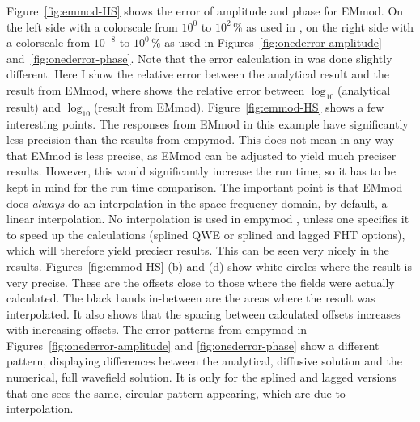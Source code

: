 \documentclass[manuscript,revised]{geophysics}
\begin{document}
Figure~\ref{fig:emmod-HS} shows the error of amplitude and phase for EMmod.
On the left side with a colorscale from $10^0$ to $10^2$\,\% as used in
\cite{GEO.15.Hunziker}, on the right side with a colorscale
from $10^{-8}$ to $10^0$\,\% as used in Figures~\ref{fig:onederror-amplitude}
and~\ref{fig:onederror-phase}. Note that the error calculation in
\cite{GEO.15.Hunziker} was done slightly different. Here I
show the relative error between the analytical result and the result from
EMmod, where \cite{GEO.15.Hunziker} shows the relative error
between $\log_{10}$(analytical result) and $\log_{10}$(result from EMmod).
%
%
Figure~\ref{fig:emmod-HS} shows a few interesting points. The responses from
EMmod in this example have significantly less precision than the results from
empymod. This does not mean in any way that EMmod is less precise, as EMmod
can be adjusted to yield much preciser results. However, this would
significantly increase the run time, so it has to be kept in mind for the run
time comparison. The important point is that EMmod does \emph{always} do an
interpolation in the space-frequency domain, by default, a linear
interpolation.  No interpolation is used in empymod , unless one specifies it to speed up the calculations
(splined QWE or splined and lagged FHT options), which will therefore yield
preciser results. This can be seen very nicely in the results.
Figures~\ref{fig:emmod-HS} (b) and (d) show white circles where the result is
very precise. These are the offsets close to those where the fields were
actually calculated. The black bands in-between are the areas where the result
was interpolated. It also shows that the spacing between calculated offsets
increases with increasing offsets. The error patterns from empymod in
Figures~\ref{fig:onederror-amplitude} and \ref{fig:onederror-phase} show
  a different pattern, displaying  differences between the analytical,
diffusive solution and the numerical, full wavefield solution. It is only for
the splined and lagged versions that one sees the same, circular pattern
appearing, which are due to interpolation.
\end{document}
